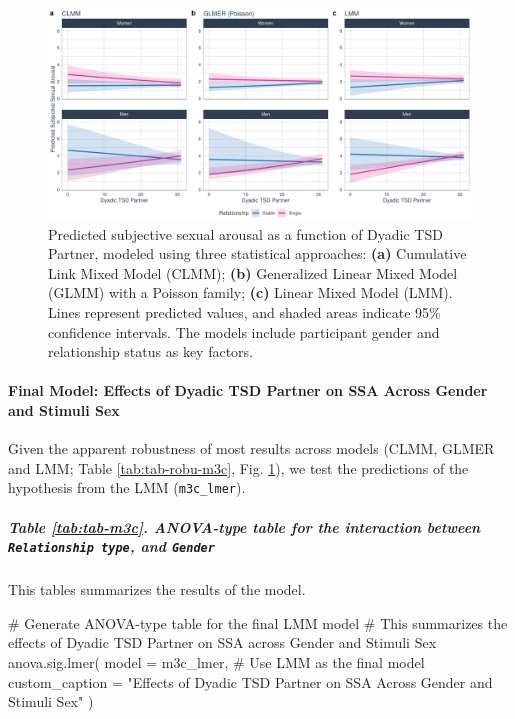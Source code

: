 \documentclass[
  bookmarksnumbered]{article}
\newenvironment{Shaded}{\begin{snugshade}}{\end{snugshade}}
\newcommand{\AttributeTok}[1]{\textcolor[rgb]{0.80,0.80,0.80}{#1}}
\newcommand{\CommentTok}[1]{\textcolor[rgb]{0.50,0.62,0.50}{#1}}
\newcommand{\FunctionTok}[1]{\textcolor[rgb]{0.94,0.94,0.56}{#1}}
\newcommand{\NormalTok}[1]{\textcolor[rgb]{0.80,0.80,0.80}{#1}}
\newcommand{\StringTok}[1]{\textcolor[rgb]{0.80,0.58,0.58}{#1}}
\begin{document}
\begin{figure}
\centering
\includegraphics{Sexual_Desire_Arousal_files/figure-latex/preds-m3c-1.pdf}
\caption{\label{fig:preds-m3c}Predicted subjective sexual arousal as a function of Dyadic TSD Partner, modeled using three statistical approaches: \textbf{(a)} Cumulative Link Mixed Model (CLMM); \textbf{(b)} Generalized Linear Mixed Model (GLMM) with a Poisson family; \textbf{(c)} Linear Mixed Model (LMM). Lines represent predicted values, and shaded areas indicate 95\% confidence intervals. The models include participant gender and relationship status as key factors.}
\end{figure}

\paragraph{Final Model: Effects of Dyadic TSD Partner on SSA Across Gender and Stimuli Sex}\label{final-model-effects-of-dyadic-tsd-partner-on-ssa-across-gender-and-stimuli-sex-1}

Given the apparent robustness of most results across models (CLMM, GLMER and LMM; Table \ref{tab:tab-robu-m3c}, Fig. \ref{fig:preds-m3c}), we test the predictions of the hypothesis from the LMM (\texttt{m3c\_lmer}).

\subparagraph{\texorpdfstring{Table \ref{tab:tab-m3c}. ANOVA-type table for the interaction between \texttt{Relationship\ type}, and \texttt{Gender}}{Table \ref{tab:tab-m3c}. ANOVA-type table for the interaction between Relationship type, and Gender}}\label{table-reftabtab-m3c.-anova-type-table-for-the-interaction-between-relationship-type-and-gender}

This tables summarizes the results of the model.

\begin{Shaded}
\begin{Highlighting}[]
\CommentTok{\# Generate ANOVA{-}type table for the final LMM model}
\CommentTok{\# This summarizes the effects of Dyadic TSD Partner on SSA across Gender and Stimuli Sex}
\FunctionTok{anova.sig.lmer}\NormalTok{(}
  \AttributeTok{model =}\NormalTok{ m3c\_lmer, }\CommentTok{\# Use LMM as the final model}
  \AttributeTok{custom\_caption =} \StringTok{"Effects of Dyadic TSD Partner on SSA Across Gender and Stimuli Sex"}
\NormalTok{)}
\end{Highlighting}
\end{Shaded}
\end{document}
